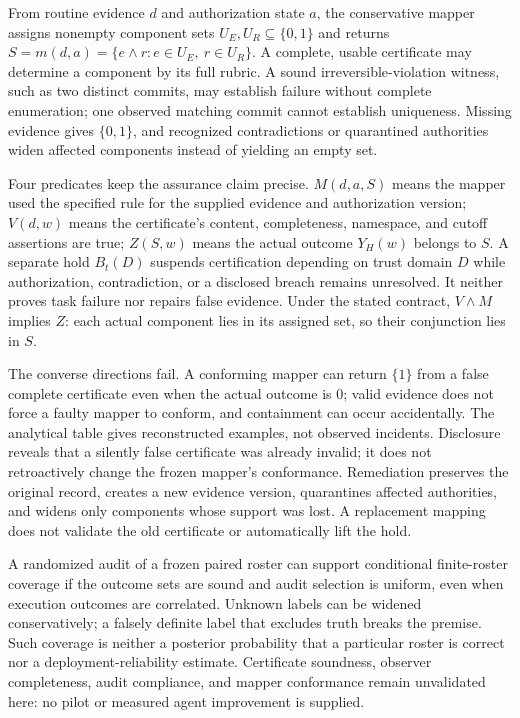 \documentclass[11pt]{article}
\begin{document}
From routine evidence $d$ and authorization state $a$, the conservative mapper assigns nonempty component sets $U_E,U_R\subseteq\{0,1\}$ and returns $S=m(d,a)=\{e\land r:e\in U_E,\ r\in U_R\}$. A complete, usable certificate may determine a component by its full rubric. A sound irreversible-violation witness, such as two distinct commits, may establish failure without complete enumeration; one observed matching commit cannot establish uniqueness. Missing evidence gives $\{0,1\}$, and recognized contradictions or quarantined authorities widen affected components instead of yielding an empty set.

Four predicates keep the assurance claim precise. $M(d,a,S)$ means the mapper used the specified rule for the supplied evidence and authorization version; $V(d,w)$ means the certificate's content, completeness, namespace, and cutoff assertions are true; $Z(S,w)$ means the actual outcome $Y_H(w)$ belongs to $S$. A separate hold $B_t(D)$ suspends certification depending on trust domain $D$ while authorization, contradiction, or a disclosed breach remains unresolved. It neither proves task failure nor repairs false evidence. Under the stated contract, $V\land M$ implies $Z$: each actual component lies in its assigned set, so their conjunction lies in $S$.

The converse directions fail. A conforming mapper can return $\{1\}$ from a false complete certificate even when the actual outcome is $0$; valid evidence does not force a faulty mapper to conform, and containment can occur accidentally. The analytical table gives reconstructed examples, not observed incidents. Disclosure reveals that a silently false certificate was already invalid; it does not retroactively change the frozen mapper's conformance. Remediation preserves the original record, creates a new evidence version, quarantines affected authorities, and widens only components whose support was lost. A replacement mapping does not validate the old certificate or automatically lift the hold.

A randomized audit of a frozen paired roster can support conditional finite-roster coverage if the outcome sets are sound and audit selection is uniform, even when execution outcomes are correlated. Unknown labels can be widened conservatively; a falsely definite label that excludes truth breaks the premise. Such coverage is neither a posterior probability that a particular roster is correct nor a deployment-reliability estimate. Certificate soundness, observer completeness, audit compliance, and mapper conformance remain unvalidated here: no pilot or measured agent improvement is supplied.
\end{document}
